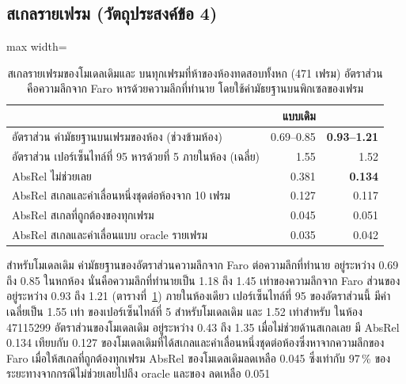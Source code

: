 \subsection{สเกลรายเฟรม (วัตถุประสงค์ข้อ 4)}\label{sec:scale}
\begin{table}[t]
\centering\small
\caption{สเกลรายเฟรมของโมเดลเดิมและ \ftmain{} บนทุกเฟรมที่ห้าของห้องทดสอบทั้งหก (471 เฟรม)
อัตราส่วน คือความลึกจาก Faro หารด้วยความลึกที่ทำนาย โดยใช้ค่ามัธยฐานบนพิกเซลของเฟรม}
\label{tab:scale}
\begin{adjustbox}{max width=\columnwidth}
\begin{tabular}{@{}lrr@{}}
\toprule
 & แบบเดิม & \textbf{\ftmain{}} \\
\midrule
อัตราส่วน ค่ามัธยฐานบนเฟรมของห้อง (ช่วงข้ามห้อง) & 0.69--0.85 & \textbf{0.93--1.21} \\
อัตราส่วน เปอร์เซ็นไทล์ที่ 95 หารด้วยที่ 5 ภายในห้อง (เฉลี่ย) & 1.55 & 1.52 \\
AbsRel ไม่ช่วยเลย & 0.381 & \textbf{0.134} \\
AbsRel สเกลและค่าเลื่อนหนึ่งชุดต่อห้องจาก 10 เฟรม & 0.127 & 0.117 \\
AbsRel สเกลที่ถูกต้องของทุกเฟรม & 0.045 & 0.051 \\
AbsRel สเกลและค่าเลื่อนแบบ oracle รายเฟรม & 0.035 & 0.042 \\
\bottomrule
\end{tabular}
\end{adjustbox}
\end{table}

สำหรับโมเดลเดิม ค่ามัธยฐานของอัตราส่วนความลึกจาก Faro ต่อความลึกที่ทำนาย อยู่ระหว่าง 0.69 ถึง 0.85 ในหกห้อง
นั่นคือความลึกที่ทำนายเป็น 1.18 ถึง 1.45 เท่าของความลึกจาก Faro ส่วนของ \ftmain{} อยู่ระหว่าง 0.93 ถึง 1.21
(ตารางที่~\ref{tab:scale}) ภายในห้องเดียว เปอร์เซ็นไทล์ที่ 95 ของอัตราส่วนนี้ มีค่าเฉลี่ยเป็น 1.55 เท่า
ของเปอร์เซ็นไทล์ที่ 5 สำหรับโมเดลเดิม และ 1.52 เท่าสำหรับ \ftmain{} ในห้อง 47115299 อัตราส่วนของโมเดลเดิม
อยู่ระหว่าง 0.43 ถึง 1.35 เมื่อไม่ช่วยด้านสเกลเลย \ftmain{} มี AbsRel 0.134 เทียบกับ 0.127
ของโมเดลเดิมที่ได้สเกลและค่าเลื่อนหนึ่งชุดต่อห้องซึ่งหาจากความลึกของ Faro เมื่อให้สเกลที่ถูกต้องทุกเฟรม
AbsRel ของโมเดลเดิมลดเหลือ 0.045 ซึ่งเท่ากับ 97\,\% ของระยะทางจากกรณีไม่ช่วยเลยไปถึง oracle
และของ \ftmain{} ลดเหลือ 0.051

